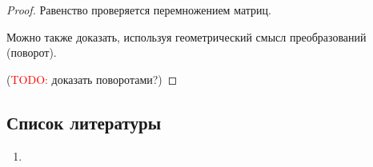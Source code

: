 \begin{proof}
  Равенство проверяется перемножением матриц.

  Можно также доказать, используя геометрический смысл преобразований (поворот).

  (\textcolor{red}{TODO:} доказать поворотами?)
\end{proof}

\subsection{Список литературы}
\begin{enumerate}
  \item \cite{lourie}
\end{enumerate}

